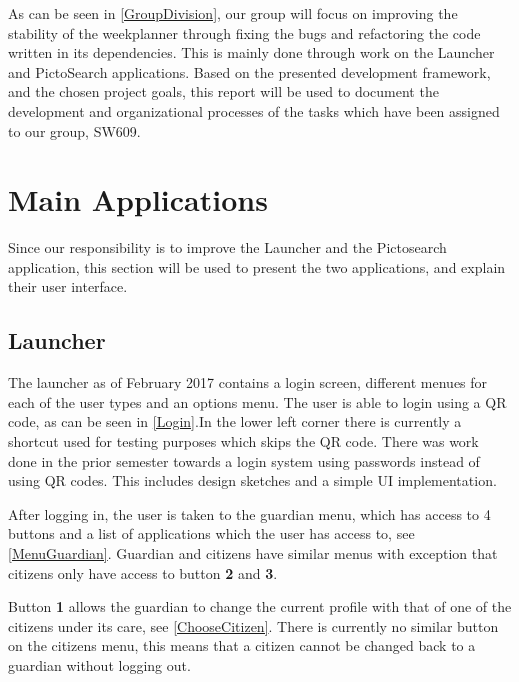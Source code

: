 As can be seen in \autoref{GroupDivision}, our group will focus on improving the
stability of the weekplanner through fixing the bugs and refactoring the code
written in its dependencies. This is mainly done through work on the Launcher
and PictoSearch applications. Based on the presented development framework, and
the chosen project goals, this report will be used to document the development
and organizational processes of the tasks which have been assigned to our group,
SW609.

\section{Main Applications}
Since our responsibility is to improve the Launcher and the Pictosearch
application, this section will be used to present the two applications, and
explain their user interface.

\subsection{Launcher}\label{LauncherReview}
The launcher as of February 2017 contains a login screen, different menues for
each of the user types and an options menu. The user is able to login using a
QR code, as can be seen in \autoref{Login}.In the lower left corner there is
currently a shortcut used for testing purposes which skips the QR code. There
was work done in the prior semester towards a login system using passwords
instead of using QR codes. This includes design sketches and a simple UI
implementation.


After logging in, the user is taken to the guardian menu, which has access to 4
buttons and a list of applications which the user has access to,
see \autoref{MenuGuardian}. Guardian and citizens have similar menus with
exception that citizens only have access to button \textbf{2} and \textbf{3}.


Button \textbf{1} allows the guardian to change the current profile with that of
one of the citizens under its care, see \autoref{ChooseCitizen}. There is currently no
similar button on the citizens menu, this means that a citizen cannot be changed
back to a guardian without logging out.

